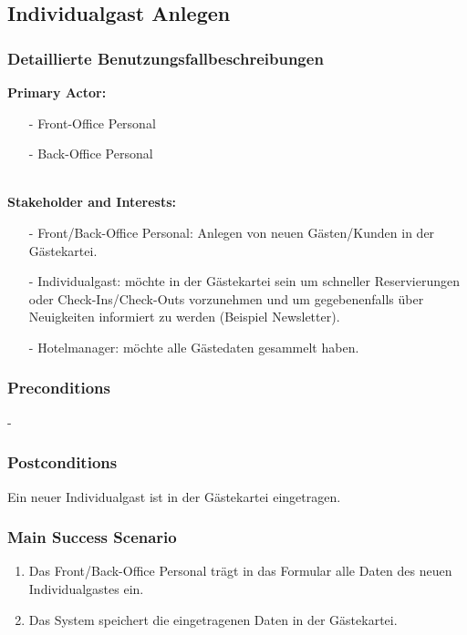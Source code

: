 \documentclass[./detailed_overview_usecases.tex]{subfiles}
\begin{document}
    \subsection{Individualgast Anlegen}
    \subsubsection{Detaillierte Benutzungsfallbeschreibungen}
    \textbf{Primary Actor:}
    \begin{itemize}
        \item[-] Front-Office Personal
        \item[-] Back-Office Personal
    \end{itemize}
    \\
    \textbf{Stakeholder and Interests:}
    \begin{itemize}
        \item[-] Front/Back-Office Personal: Anlegen von neuen Gästen/Kunden in der Gästekartei.
        \item[-] Individualgast: möchte in der Gästekartei sein um schneller Reservierungen oder Check-Ins/Check-Outs vorzunehmen
        und um gegebenenfalls über Neuigkeiten informiert zu werden (Beispiel Newsletter).
        \item[-] Hotelmanager: möchte alle Gästedaten gesammelt haben.
    \end{itemize}

    \subsubsection*{Preconditions}
    -

    \subsubsection*{Postconditions}
    Ein neuer Individualgast ist in der Gästekartei eingetragen.

    \subsubsection*{Main Success Scenario}
    \begin{enumerate}
        \item Das Front/Back-Office Personal trägt in das Formular alle Daten des neuen Individualgastes ein.
        \item Das System speichert die eingetragenen Daten in der Gästekartei.
    \end{enumerate}
\end{document}
